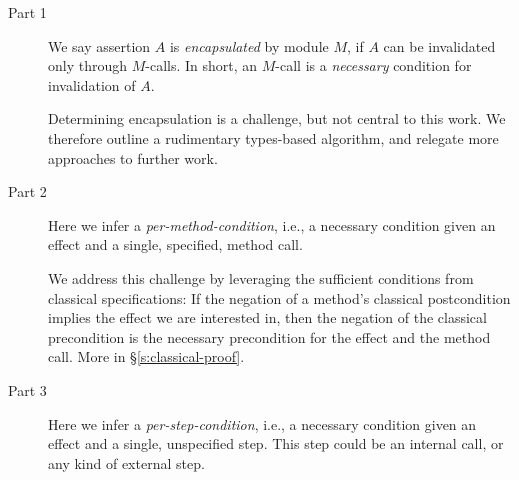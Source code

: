 \begin{description}
\item[Part 1] 
We  say assertion $A$  is
\emph{encapsulated} by  module $M$, if  $A$ can be invalidated only through
  $M$-\internalC calls. In short, an $M$-\internalC call is a \emph{necessary} condition for
invalidation of $A$.

Determining encapsulation is a challenge, but not central to this work.
We therefore outline a rudimentary types-based algorithm, and relegate more
approaches to further work.
  
\item[Part 2]
 Here we infer a \emph{per-method-condition}, i.e., a 
 necessary condition given an effect and
a single, specified, method call. 
% 

We address this  challenge %
 by leveraging the sufficient conditions from classical specifications:
If the negation of a method's
 classical postcondition implies  the effect we are interested in, then the negation of the 
 classical precondition  is the necessary precondition for the effect and the method call.
More in \S\ref{s:classical-proof}.  



  
\item[Part 3]
Here we infer a \emph{per-step-condition}, i.e., a 
 necessary condition given an effect and
a single, unspecified step. This step could be an internal call, or any kind of external step.



\end{description}
